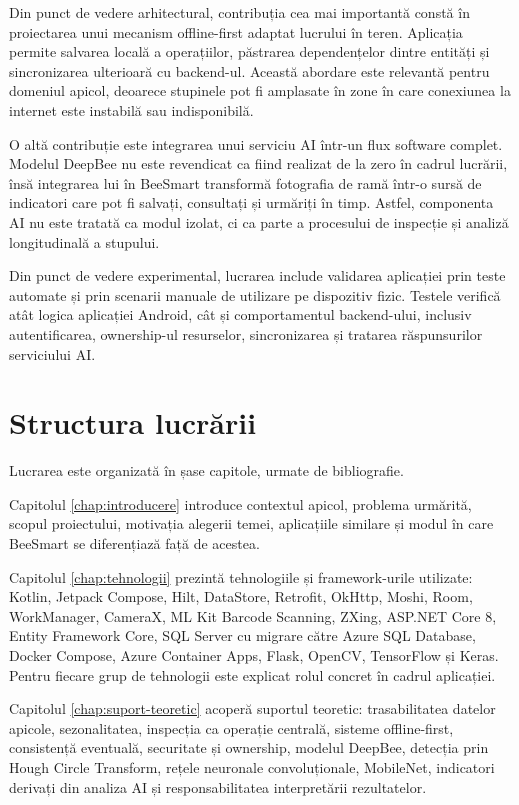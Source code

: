 Din punct de vedere arhitectural, contribuția cea mai importantă constă în proiectarea unui mecanism offline-first adaptat lucrului în teren. Aplicația permite salvarea locală a operațiilor, păstrarea dependențelor dintre entități și sincronizarea ulterioară cu backend-ul. Această abordare este relevantă pentru domeniul apicol, deoarece stupinele pot fi amplasate în zone în care conexiunea la internet este instabilă sau indisponibilă.

O altă contribuție este integrarea unui serviciu AI într-un flux software complet. Modelul DeepBee nu este revendicat ca fiind realizat de la zero în cadrul lucrării, însă integrarea lui în BeeSmart transformă fotografia de ramă într-o sursă de indicatori care pot fi salvați, consultați și urmăriți în timp. Astfel, componenta AI nu este tratată ca modul izolat, ci ca parte a procesului de inspecție și analiză longitudinală a stupului.

Din punct de vedere experimental, lucrarea include validarea aplicației prin teste automate și prin scenarii manuale de utilizare pe dispozitiv fizic. Testele verifică atât logica aplicației Android, cât și comportamentul backend-ului, inclusiv autentificarea, ownership-ul resurselor, sincronizarea și tratarea răspunsurilor serviciului AI.

\section{Structura lucrării}

Lucrarea este organizată în șase capitole, urmate de bibliografie.

Capitolul \ref{chap:introducere} introduce contextul apicol, problema urmărită, scopul proiectului, motivația alegerii temei, aplicațiile similare și modul în care BeeSmart se diferențiază față de acestea.

Capitolul \ref{chap:tehnologii} prezintă tehnologiile și framework-urile utilizate: Kotlin, Jetpack Compose, Hilt, DataStore, Retrofit, OkHttp, Moshi, Room, WorkManager, CameraX, ML Kit Barcode Scanning, ZXing, ASP.NET Core 8, Entity Framework Core, SQL Server cu migrare către Azure SQL Database, Docker Compose, Azure Container Apps, Flask, OpenCV, TensorFlow și Keras. Pentru fiecare grup de tehnologii este explicat rolul concret în cadrul aplicației.

Capitolul \ref{chap:suport-teoretic} acoperă suportul teoretic: trasabilitatea datelor apicole, sezonalitatea, inspecția ca operație centrală, sisteme offline-first, consistență eventuală, securitate și ownership, modelul DeepBee, detecția prin Hough Circle Transform, rețele neuronale convoluționale, MobileNet, indicatori derivați din analiza AI și responsabilitatea interpretării rezultatelor.

